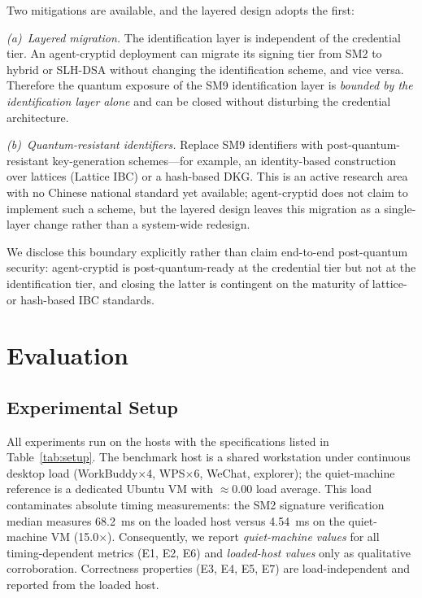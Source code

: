 \documentclass[10pt,twocolumn]{IEEEtran}
\begin{document}
Two mitigations are available, and the layered design adopts the first:

\emph{(a)~Layered migration.} The identification layer is
independent of the credential tier. An agent-cryptid deployment can
migrate its signing tier from SM2 to hybrid or SLH-DSA without
changing the identification scheme, and vice versa. Therefore the
quantum exposure of the SM9 identification layer is \emph{bounded by
the identification layer alone} and can be closed without disturbing
the credential architecture.

\emph{(b)~Quantum-resistant identifiers.} Replace SM9 identifiers
with post-quantum-resistant key-generation schemes---for example, an
identity-based construction over lattices (Lattice IBC) or a
hash-based DKG. This is an active research area with no Chinese
national standard yet available; agent-cryptid does not claim to
implement such a scheme, but the layered design leaves this migration
as a single-layer change rather than a system-wide redesign.

We disclose this boundary explicitly rather than claim end-to-end
post-quantum security: agent-cryptid is post-quantum-ready at the
credential tier but not at the identification tier, and closing the
latter is contingent on the maturity of lattice- or hash-based IBC
standards.

\section{Evaluation}

\subsection{Experimental Setup}
\label{sec:setup}

All experiments run on the hosts with the specifications listed
in Table~\ref{tab:setup}. The benchmark host is a shared workstation
under continuous desktop load (WorkBuddy$\times$4, WPS$\times$6, WeChat,
explorer); the quiet-machine reference is a dedicated Ubuntu VM with
$\approx$0.00 load average. This load contaminates absolute timing
measurements: the
SM2 signature verification median measures 68.2~ms on the loaded host
versus 4.54~ms on the quiet-machine VM (15.0$\times$). Consequently, we
report \emph{quiet-machine values} for all timing-dependent metrics
(E1, E2, E6) and \emph{loaded-host values} only as qualitative
corroboration. Correctness properties (E3, E4, E5, E7) are
load-independent and reported from the loaded host.
\end{document}
